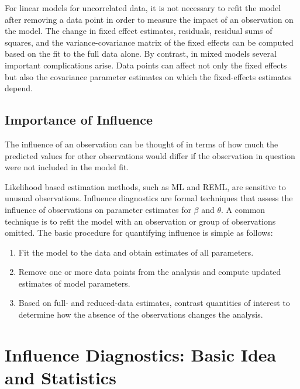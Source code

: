 \documentclass[12pt, a4paper]{report}
\theoremstyle{plain}
\theoremstyle{definition}
\theoremstyle{remark}
\begin{document}
	For linear models for uncorrelated data, it is not necessary to refit the model after removing a data point in order to measure the impact of an observation on the model. The change in fixed effect estimates, residuals, residual sums of squares, and the variance-covariance matrix of the fixed effects can be computed based on the fit to the full data alone. By contrast, in mixed models several important complications arise. Data points can affect not only the fixed effects but also the covariance parameter estimates on which the fixed-effects estimates depend. 
	
		
		\subsection{Importance of Influence}
		The influence of an observation can be thought of in terms of how much the predicted values for other observations would differ if the observation in question were not included in the model fit.
		
		Likelihood based estimation methods, such as ML and REML, are sensitive to unusual observations. Influence diagnostics are formal techniques that assess the influence of observations on parameter estimates for $\beta$ and $\theta$. A common technique is to refit the model with an observation or group of observations omitted. The basic procedure for quantifying influence is simple as follows:
		
		
		\begin{enumerate}
			\item Fit the model to the data and obtain estimates of all parameters.
			\item Remove one or more data points from the analysis and compute updated estimates of model parameters.
			\item Based on full- and reduced-data estimates, contrast quantities of interest to determine how the absence of the observations changes the analysis.
		\end{enumerate}	
		

\section{Influence Diagnostics: Basic Idea and Statistics} %
\end{document}
